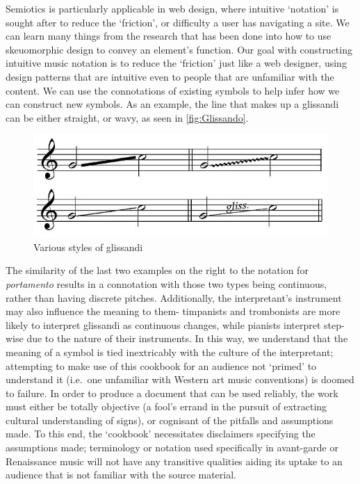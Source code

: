 Semiotics is particularly applicable in web design, where intuitive `notation' is sought after to reduce the `friction', or difficulty a user has navigating a site.
We can learn many things from the research that has been done into how to use skeuomorphic design to convey an element's function.
Our goal with constructing intuitive music notation is to reduce the `friction' just like a web designer, using design patterns that are intuitive even to people that are unfamiliar with the content.
We can use the connotations of existing symbols to help infer how we can construct new symbols.
As an example, the line that makes up a glissandi can be either straight, or wavy, as seen in \autoref{fig:Glissando}.
\begin{figure}
    \includegraphics[]{./resources/glissando.jpg}
\caption{Various styles of glissandi}\label{fig:Glissando}
\end{figure}
The similarity of the last two examples on the right to the notation for \emph{portamento} results in a connotation with those two types being continuous, rather than having discrete pitches.
Additionally, the interpretant's instrument may also influence the meaning to them- timpanists and trombonists are more likely to interpret glissandi as continuous changes, while pianists interpret step-wise due to the nature of their instruments.\autocite[]{need to find a citation for this}
In this way, we understand that the meaning of a symbol is tied inextricably with the culture of the interpretant; attempting to make use of this cookbook for an audience not `primed' to understand it (i.e.\ one unfamiliar with Western art music conventions) is doomed to failure.
In order to produce a document that can be used reliably, the work must either be totally objective (a fool's errand in the pursuit of extracting cultural understanding of signs), or cognisant of the pitfalls and assumptions made.
To this end, the `cookbook' necessitates disclaimers specifying the assumptions made; terminology or notation used specifically in avant-garde or Renaissance music will not have any transitive qualities aiding its uptake to an audience that is not familiar with the source material.

